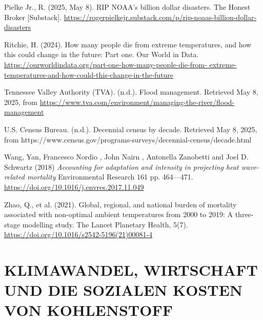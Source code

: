 \documentclass[12pt,paper=a4,DIV=12,parskip=never,chapterprefix=false,headings=standardclasses]{scrreprt}
\begin{document}
Pielke Jr., R. (2025, May 8). RIP NOAA's billion dollar disasters. The Honest Broker [Substack].
\url{https://rogerpielkejr.substack.com/p/rip-noaas-billion-dollar-disasters}

Ritchie, H. (2024). How many people die from extreme temperatures, and how this could change in the
future: Part one. Our World in Data. \url{https://ourworldindata.org/part-one-how-many-people-die-from-
extreme-temperatures-and-how-could-this-change-in-the-future}

Tennessee Valley Authority (TVA). (n.d.). Flood management. Retrieved May 8, 2025, from
\url{https://www.tva.com/environment/managing-the-river/flood-management}

U.S. Census Bureau. (n.d.). Decennial census by decade. Retrieved May 8, 2025, from
https://www.census.gov/programs-surveys/decennial-census/decade.html

Wang, Yan, Francesco Nordio , John Nairn , Antonella Zanobetti and Joel D. Schwartz (2018) \emph{Accounting
for adaptation and intensity in projecting heat wave-related mortality} Environmental Research 161 pp.
464—471. \url{https://doi.org/10.1016/j.envres.2017.11.049}

Zhao, Q., et al. (2021). Global, regional, and national burden of mortality associated with non-optimal
ambient temperatures from 2000 to 2019: A three-stage modelling study. The Lancet Planetary
Health, 5(7). \url{https://doi.org/10.1016/s2542-5196(21)00081-4}

\endgroup

\cleardoublepage
\chapter{KLIMAWANDEL, WIRTSCHAFT UND DIE SOZIALEN KOSTEN VON KOHLENSTOFF}
\end{document}

